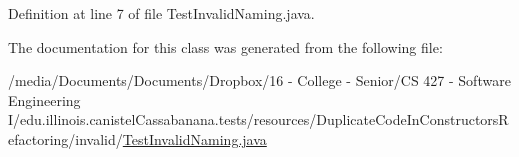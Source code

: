 Definition at line 7 of file TestInvalidNaming.java.



The documentation for this class was generated from the following file:\begin{DoxyCompactItemize}
\item 
/media/Documents/Documents/Dropbox/16 -\/ College -\/ Senior/CS 427 -\/ Software Engineering I/edu.illinois.canistelCassabanana.tests/resources/DuplicateCodeInConstructorsRefactoring/invalid/\hyperlink{TestInvalidNaming_8java}{TestInvalidNaming.java}\end{DoxyCompactItemize}

